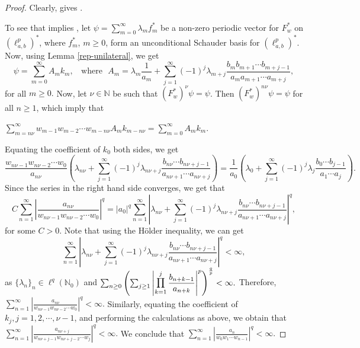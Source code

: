 \documentclass[12pt, reqno]{amsart}
\DeclareMathOperator*{\Mprod}{\text{\raisebox{0.25ex}{\scalebox{0.8}{$\prod$}}}}
\theoremstyle{definition}
\theoremstyle{remark}
\numberwithin{equation}{section}
\begin{document}
\begin{proof}
    Clearly,  gives .
    
   To see that  implies , let $\psi=\sum_{m=0}^{\infty}\lambda_{m}f_{m}^{*}$ be a non-zero periodic vector for $F_{w}^{*}$ on $(\ell^{p}_{a,b})^{*}$, where $f_m^{*}$, $m\geq 0$, form an unconditional Schauder basis for $(\ell^{p}_{a,b})^{*}$. Now, using Lemma \ref{rep-unilateral}, we get
       \[
       \psi=\sum_{m=0}^{\infty} A_{m}k_{m},~~~~\text{where}~~~A_{m}=\lambda_{m}\frac{1}{a_{m}}+\sum_{j=1}^{\infty}(-1)^{j}\lambda_{m+j}\frac{b_{m}b_{m+1}\cdots b_{m+j-1}}{a_{m}a_{m+1}\cdots a_{m+j}},
       \]
       for all $m\geq 0.$ Now, let $ \nu \in \mathbb{N}$ be such that $(F_{w}^{*})^{\nu}\psi=\psi$. Then $(F_{w}^{*})^{n\nu}\psi=\psi$ for all $n\geq 1$, which imply that
\begin{center}
    $\displaystyle{\sum_{m=n\nu}^{\infty}}w_{m-1}w_{m-2}\cdots w_{m-n\nu }A_{m}k_{m-n\nu}=\sum_{m=0}^{\infty}A_{m}k_{m}. $
\end{center}
       Equating the coefficient of $k_{0}$ both sides, we get
       \[
       \frac{w_{n\nu-1} w_{n\nu-2}\cdots w_{0}}{a_{n\nu}}\left( \lambda_{n\nu} +\sum_{j=1}^{\infty}(-1)^{j}\lambda_{n\nu+j}\frac{b_{n\nu}\cdots b_{n\nu+j-1}}{a_{n\nu+1}\cdots a_{n\nu+j}} \right)= \frac{1}{a_{0}}\left( \lambda_{0}+\sum_{j=1}^{\infty}(-1)^{j}\lambda_{j}\frac{b_{0}\cdots b_{j-1}}{a_{1}\cdots a_{j}}\right).
       \]
       Since the series in the right hand side converges, we get that
       \[
       C \sum_{n=1}^{\infty} \left\lvert \frac{a_{n\nu}}{w_{n\nu-1} w_{n\nu-2}\cdots w_{0}} \right\rvert^{q}= \left\lvert a_{0}  \right\rvert^{q}\sum_{n=1}^{\infty} \left\lvert \lambda_{n\nu} +\sum_{j=1}^{\infty}(-1)^{j}\lambda_{n\nu+j}\frac{b_{n\nu}\cdots b_{n\nu+j-1}}{a_{n\nu+1}\cdots a_{n\nu+j}} \right\rvert^{q},
       \]
       for some $C>0$. Note that using the H\"{o}lder inequality, we can get
       \[
       \sum_{n=1}^{\infty} \left\lvert\lambda_{n\nu} +\sum_{j=1}^{\infty}(-1)^{j}\lambda_{n\nu+j}\frac{b_{n\nu}\cdots b_{n\nu+j-1}}{a_{n\nu+1}\cdots a_{n\nu+j}}\right\rvert^{q}<\infty,
       \]
        as $\{\lambda_{n}\}_{n}\in \ell^{q}(\mathbb{N}_{0})$ and  $ \sum_{n\geq0}\left(\sum_{j\geq 1}\left\lvert \displaystyle\Mprod_{k=1}^{j}\frac{ b_{n+k-1}}{a_{n+k}}\right\rvert^{p}\right)^{\frac{q}{p}}<\infty.$ Therefore,\\ $\sum_{n=1}^{\infty}\left\lvert \frac{a_{n\nu}}{w_{n\nu-1} w_{n\nu-2}\cdots w_{0}} \right\rvert^{q}<\infty.$ Similarly, equating the coefficient of $k_{j}, j=1,2,\cdots,\nu-1$, and performing the calculations as above, we obtain that $\sum_{n=1}^{\infty}\left\lvert \frac {a_{n\nu+j}}{w_{n\nu+j-1} w_{n\nu+j-2}\cdots w_{j}}\right\rvert^{q}<\infty.$ We conclude that $\sum_{n=1}^{\infty}\left\lvert \frac{a_{n}}{w_{0}w_{1}\cdots w_{n-1}}\right\rvert^{q}<\infty.$


\end{proof}
\end{document}
